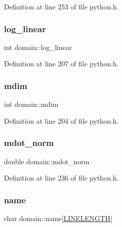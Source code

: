Definition at line 253 of file python.\+h.

\mbox{\label{structdomain_a8e5c1206fd8d19c47be7b5154b5217b9}} 
\subsubsection{\texorpdfstring{log\+\_\+linear}{log\_linear}}
{\footnotesize\ttfamily int domain\+::log\+\_\+linear}



Definition at line 207 of file python.\+h.

\mbox{\label{structdomain_aa557b63d514dffedaf76a635579b3294}} 
\subsubsection{\texorpdfstring{mdim}{mdim}}
{\footnotesize\ttfamily int domain\+::mdim}



Definition at line 204 of file python.\+h.

\mbox{\label{structdomain_a424d4ae859ddf9dc456d1f91e4ffe86d}} 
\subsubsection{\texorpdfstring{mdot\+\_\+norm}{mdot\_norm}}
{\footnotesize\ttfamily double domain\+::mdot\+\_\+norm}



Definition at line 236 of file python.\+h.

\mbox{\label{structdomain_a0956e1c9c45266a6512b1571427711f6}} 
\subsubsection{\texorpdfstring{name}{name}}
{\footnotesize\ttfamily char domain\+::name\mbox{[}\hyperlink{xlog_8c_a10e8c7b8458375c3dbfbb4010a2aba8c}{L\+I\+N\+E\+L\+E\+N\+G\+TH}\mbox{]}}



